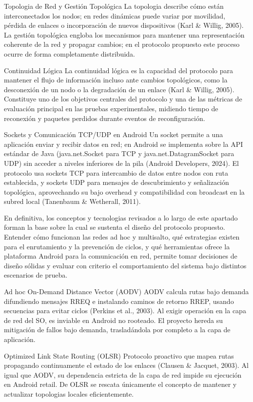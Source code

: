 Topologia de Red y Gestión Topológica La topologia describe cómo están interconectados los nodos; en redes dinámicas puede variar por movilidad, pérdida de enlaces o incorporación de nuevos dispositivos (Karl \& Willig, 2005). La gestión topológica engloba los mecanismos para mantener una representación coherente de la red y propagar cambios; en el protocolo propuesto este proceso ocurre de forma completamente distribuida.

Continuidad Lógica La continuidad lógica es la capacidad del protocolo para mantener el flujo de información incluso ante cambios topológicos, como la desconexión de un nodo o la degradación de un enlace (Karl \& Willig, 2005). Constituye uno de los objetivos centrales del protocolo y una de las métricas de evaluación principal en las pruebas experimentales, midiendo tiempo de reconexión y paquetes perdidos durante eventos de reconfiguración.

Sockets y Comunicación TCP/UDP en Android Un socket permite a una aplicación enviar y recibir datos en red; en Android se implementa sobre la API estándar de Java (java.net.Socket para TCP y java.net.DatagramSocket para UDP) sin acceder a niveles inferiores de la pila (Android Developers, 2024). El protocolo usa sockets TCP para intercambio de datos entre nodos con ruta establecida, y sockets UDP para mensajes de descubrimiento y señalización topológica, aprovechando su bajo overhead y compatibilidad con broadcast en la subred local (Tanenbaum \& Wetherall, 2011).

En definitiva, los conceptos y tecnologias revisados a lo largo de este apartado forman la base sobre la cual se sustenta el diseño del protocolo propuesto. Entender cómo funcionan las redes ad hoc y multisalto, qué estrategias existen para el enrutamiento y la prevención de ciclos, y qué herramientas ofrece la plataforma Android para la comunicación en red, permite tomar decisiones de diseño sólidas y evaluar con criterio el comportamiento del sistema bajo distintos escenarios de prueba.


Ad hoc On-Demand Distance Vector (AODV) AODV calcula rutas bajo demanda difundiendo mensajes RREQ e instalando caminos de retorno RREP, usando secuencias para evitar ciclos (Perkins et al., 2003). Al exigir operación en la capa de red del SO, es inviable en Android no rooteado. El proyecto hereda su mitigación de fallos bajo demanda, trasladándola por completo a la capa de aplicación.

Optimized Link State Routing (OLSR) Protocolo proactivo que mapea rutas propagando continuamente el estado de los enlaces (Clausen \& Jacquet, 2003). Al igual que AODV, su dependencia estricta de la capa de red impide su ejecución en Android retail. De OLSR se rescata únicamente el concepto de mantener y actualizar topologias locales eficientemente.

